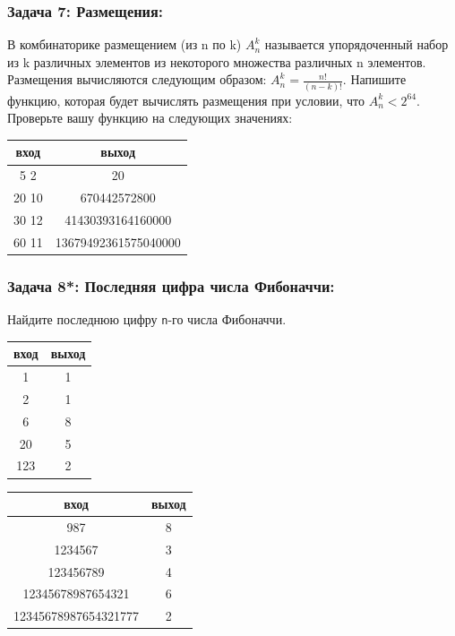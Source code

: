 \documentclass{article}
\begin{document}
\subsubsection*{Задача 7: Размещения:} В комбинаторике размещением (из n по k) $A_n^k$ называется упорядоченный набор из k различных элементов из некоторого множества различных n элементов. Размещения вычисляются следующим образом: $A_n^k = \frac{n!}{(n-k)!}$. Напишите функцию, которая будет вычислять размещения при условии, что  $A_n^k < 2^{64}$. Проверьте вашу функцию на следующих значениях:
\begin{center}
\begin{tabular}{ c c }
 вход & выход \\ \hline
 5 2 & 20  \\ 
 20 10 & 670442572800  \\ 
 30 12 & 41430393164160000 \\ 
 60 11 & 13679492361575040000 \\   
\end{tabular}
\end{center}


\subsubsection*{Задача 8\textbf{*}: Последняя цифра числа Фибоначчи:} Найдите последнюю цифру \texttt{n}-го числа Фибоначчи.
\begin{center}
\begin{multicols}{2}
\begin{tabular}{ c c }
 вход & выход \\ \hline
 1 & 1  \\ 
 2 & 1  \\ 
 6 & 8 \\  
 20 & 5 \\   
 123 & 2 \\   
\end{tabular}
\begin{tabular}{ c c }
 вход & выход \\ \hline
 987 & 8 \\  
 1234567 & 3  \\ 
 123456789 & 4 \\  
 12345678987654321 & 6 \\
 12345678987654321777 & 2 \\   
\end{tabular}
\end{multicols}
\end{center}
\end{document}
